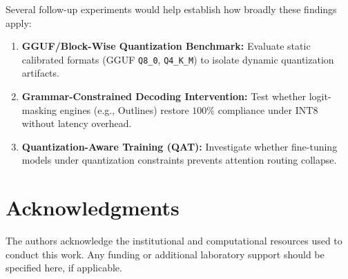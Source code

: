 \documentclass[10pt, conference, a4paper]{IEEEtran}
\begin{document}
Several follow-up experiments would help establish how broadly these findings apply:
\begin{enumerate}
    \item \textbf{GGUF/Block-Wise Quantization Benchmark:} Evaluate static calibrated formats (GGUF \texttt{Q8\_0}, \texttt{Q4\_K\_M}) to isolate dynamic quantization artifacts.
    \item \textbf{Grammar-Constrained Decoding Intervention:} Test whether logit-masking engines (e.g., Outlines) restore $100\%$ compliance under $\text{INT8}$ without latency overhead.
    \item \textbf{Quantization-Aware Training (QAT):} Investigate whether fine-tuning models under quantization constraints prevents attention routing collapse.
\end{enumerate}

\section*{Acknowledgments}
The authors acknowledge the institutional and computational resources used to conduct this work. Any funding or additional laboratory support should be specified here, if applicable.



\end{document}

